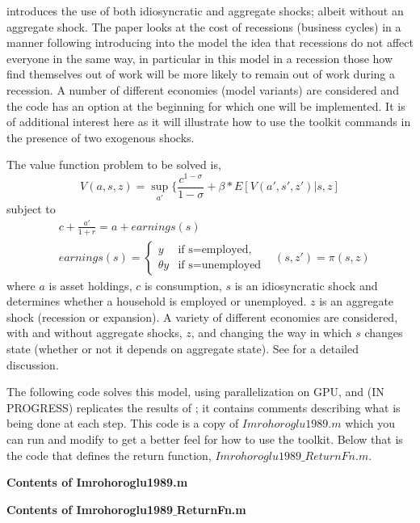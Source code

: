 %

\cite{Imrohoroglu1989} introduces the use of both idiosyncratic and aggregate shocks; albeit without an aggregate shock.
The paper looks at the cost of recessions (business cycles) in a manner following \cite{Lucas1987} introducing into the model
the idea that recessions do not affect everyone in the same way, in particular in this model in a recession those how
find themselves out of work will be more likely to remain out of work during a recession. A number of different economies
(model variants) are considered and the code has an option at the beginning for which one will be implemented.
It is of additional interest here as it will illustrate how to use the toolkit commands in the presence of two exogenous shocks.

The value function problem to be solved is,
\begin{equation*}
 V(a,s,z)=\sup_{a'} \{ \frac{c^{1-\sigma}}{1-\sigma}+\beta*E[V(a',s',z')|s,z]
\end{equation*}
subject to
\begin{align*}
 & c+\frac{a'}{1+r}=a+earnings(s) \\
 & earnings(s)=\left\{ \begin{array}{lr} y & \text{if s=employed}, \\ \theta y & \text{if s=unemployed} \end{array} \right.
 & (s,z')=\pi(s,z)
\end{align*}
where $a$ is asset holdings, $c$ is consumption, $s$ is an idiosyncratic shock and determines whether
a household is employed or unemployed. $z$ is an aggregate shock (recession or expansion). 
A variety of different economies are considered, with and without aggregate shocks, $z$, and changing
the way in which $s$ changes state (whether or not it depends on aggregate state). See \cite{Imrohoroglu1989}
for a detailed discussion.


The following code solves this model, using parallelization on GPU, and (IN PROGRESS) replicates the results
of \cite{Imrohoroglu1989}; it contains comments describing what is being done
at each step. This code is a copy of $Imrohoroglu1989.m$ which you can run and modify to get a better feel for how
to use the toolkit. Below that is the code that defines the return function, $Imrohoroglu1989\_{}ReturnFn.m$.

\textbf{Contents of Imrohoroglu1989.m}


\smallskip

\textbf{Contents of Imrohoroglu1989$\_{}$ReturnFn.m}


%